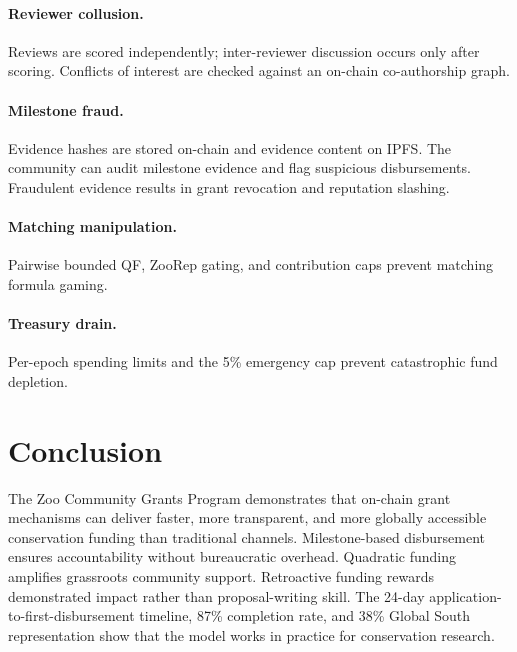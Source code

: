 \documentclass[11pt,letterpaper]{article}
\begin{document}
\paragraph{Reviewer collusion.} Reviews are scored independently; inter-reviewer discussion occurs only after scoring. Conflicts of interest are checked against an on-chain co-authorship graph.

\paragraph{Milestone fraud.} Evidence hashes are stored on-chain and evidence content on IPFS. The community can audit milestone evidence and flag suspicious disbursements. Fraudulent evidence results in grant revocation and reputation slashing.

\paragraph{Matching manipulation.} Pairwise bounded QF, ZooRep gating, and contribution caps prevent matching formula gaming.

\paragraph{Treasury drain.} Per-epoch spending limits and the 5\% emergency cap prevent catastrophic fund depletion.

\section{Conclusion}
\label{sec:conclusion}

The Zoo Community Grants Program demonstrates that on-chain grant mechanisms can deliver faster, more transparent, and more globally accessible conservation funding than traditional channels. Milestone-based disbursement ensures accountability without bureaucratic overhead. Quadratic funding amplifies grassroots community support. Retroactive funding rewards demonstrated impact rather than proposal-writing skill. The 24-day application-to-first-disbursement timeline, 87\% completion rate, and 38\% Global South representation show that the model works in practice for conservation research.

\end{document}
